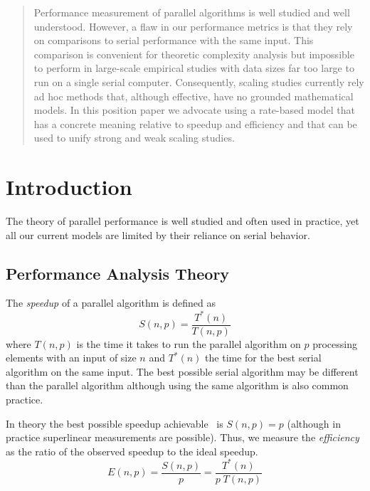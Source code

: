 \documentclass[conference]{IEEEtran}
\newcommand*{\lcite}[1]{~\cite{#1}}
\newcommand*{\keyterm}[1]{\emph{#1}}
\begin{document}
\maketitle


\begin{abstract}
Performance measurement of parallel algorithms is well studied and well
understood. However, a flaw in our performance metrics is that they rely on
comparisons to serial performance with the same input. This comparison is
convenient for theoretic complexity analysis but impossible to perform in
large-scale empirical studies with data sizes far too large to run on a
single serial computer.  Consequently, scaling studies currently rely ad
hoc methods that, although effective, have no grounded mathematical models.
In this position paper we advocate using a rate-based model that has a
concrete meaning relative to speedup and efficiency and that can be used to
unify strong and weak scaling studies.
\end{abstract}

\section{Introduction}

\noindent
The theory of parallel performance is well studied and often used in
practice, yet all our current models are limited by their reliance on
serial behavior.

\subsection{Performance Analysis Theory}

\noindent
The \keyterm{speedup} of a parallel algorithm is defined as
\begin{equation}
  S(n,p) = \frac{T^*(n)}{T(n,p)}
  \label{eq:speedup}
\end{equation}
where $T(n,p)$ is the time it takes to run the parallel algorithm on $p$
processing elements with an input of size $n$ and $T^*(n)$ the time for the
best serial algorithm on the same input. The best possible serial algorithm
may be different than the parallel algorithm although using the same
algorithm is also common practice.

In theory the best possible speedup achievable\lcite{Faber1986} is $S(n,p)
= p$ (although in practice superlinear measurements are possible). Thus, we
measure the \keyterm{efficiency} as the ratio of the observed speedup to
the ideal speedup.
\begin{equation}
  E(n,p) = \frac{S(n,p)}{p} = \frac{T^*(n)}{p \; T(n,p)}
  \label{eq:efficiency}
\end{equation}
\end{document}
